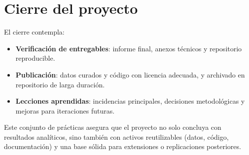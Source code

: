 \section{Cierre del proyecto}\label{sec:cierre-del-proyecto}

El cierre contempla:
\begin{itemize}
    \item \textbf{Verificación de entregables}: informe final, anexos técnicos y repositorio reproducible.
    \item \textbf{Publicación}: datos curados y código con licencia adecuada, y archivado en repositorio de larga duración.
    \item \textbf{Lecciones aprendidas}: incidencias principales, decisiones metodológicas y mejoras para iteraciones futuras.
\end{itemize}

Este conjunto de prácticas asegura que el proyecto no solo concluya con resultados analíticos,
sino también con activos reutilizables (datos, código, documentación) y una base sólida para
extensiones o replicaciones posteriores.